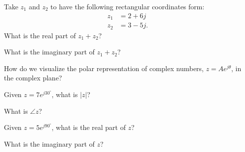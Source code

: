 
\begin{enumerate}


\qitem Take $z_1$ and $z_2$ to have the following rectangular coordinates form:
    \begin{align*}
        z_1 &= 2 + 6j \\
        z_2 &= 3 - 5j.
    \end{align*}
    What is the real part of $z_1 + z_2$?


\qitem What is the imaginary part of $z_1 + z_2$?




\qitem How do we visualize the polar representation of complex numbers, $z = A e^{j\theta}$, in the complex plane?

\sol{
	
}

\qitem Given $z = 7e^{j30^\circ}$, what is $|z|$?


\qitem What is $\angle z$?


\qitem Given $z = 5e^{j90^\circ}$, what is the real part of $z$?


\qitem What is the imaginary part of $z$?






\end{enumerate}